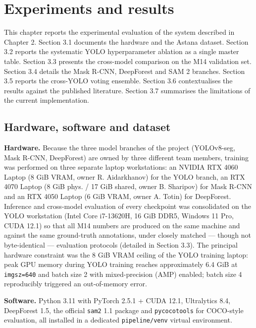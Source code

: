 \chapter{Experiments and results}\label{chapter-3.-experiments-and-results}

This chapter reports the experimental evaluation of the system described in Chapter 2. Section 3.1 documents the hardware and the Astana dataset. Section 3.2 reports the systematic YOLO hyperparameter ablation as a single master table. Section 3.3 presents the cross-model comparison on the M14 validation set. Section 3.4 details the Mask R-CNN, DeepForest and SAM 2 branches. Section 3.5 reports the cross-YOLO voting ensemble. Section 3.6 contextualises the results against the published literature. Section 3.7 summarises the limitations of the current implementation.

\section{Hardware, software and dataset}\label{hardware-software-and-dataset}

\textbf{Hardware.} Because the three model branches of the project (YOLOv8-seg, Mask R-CNN, DeepForest) are owned by three different team members, training was performed on three separate laptop workstations: an NVIDIA RTX 4060 Laptop (8 GiB VRAM, owner R. Aidarkhanov) for the YOLO branch, an RTX 4070 Laptop (8 GiB phys. / 17 GiB shared, owner B. Sharipov) for Mask R-CNN and an RTX 4050 Laptop (6 GiB VRAM, owner A. Totin) for DeepForest. Inference and cross-model evaluation of every checkpoint was consolidated on the YOLO workstation (Intel Core i7-13620H, 16 GiB DDR5, Windows 11 Pro, CUDA 12.1) so that all M14 numbers are produced on the same machine and against the same ground-truth annotations, under closely matched --- though not byte-identical --- evaluation protocols (detailed in Section 3.3). The principal hardware constraint was the 8 GiB VRAM ceiling of the YOLO training laptop: peak GPU memory during YOLO training reaches approximately 6.4 GiB at \texttt{imgsz=640} and batch size 2 with mixed-precision (AMP) enabled; batch size 4 reproducibly triggered an out-of-memory error.

\textbf{Software.} Python 3.11 with PyTorch 2.5.1 + CUDA 12.1, Ultralytics 8.4, DeepForest 1.5, the official \texttt{sam2} 1.1 package and \texttt{pycocotools} for COCO-style evaluation, all installed in a dedicated \texttt{pipeline/venv} virtual environment.

